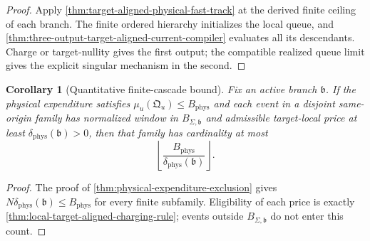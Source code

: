 \documentclass[11pt]{article}
\numberwithin{section}{part}
\theoremstyle{plain}
\newtheorem{corollary}[corollary]{Corollary}
\theoremstyle{definition}
\theoremstyle{remark}
\newcommand{\Phys}{\mathrm{phys}}
\newcommand{\Budget}{B_{\Phys}}
\begin{document}
\begin{proof}
Apply \cref{thm:target-aligned-physical-fast-track} at the derived finite
ceiling of each branch.  The finite ordered hierarchy initializes the local
queue, and \cref{thm:three-output-target-aligned-current-compiler} evaluates
all its descendants.  Charge or target-nullity gives the first output; the
compatible realized queue limit gives the explicit singular mechanism in the
second.
\end{proof}

\begin{corollary}[Quantitative finite-cascade bound]
\label{cor:finite-cascade-bound}
Fix an active branch \(\mathfrak b\).  If the physical expenditure satisfies
\(\mu_u(\mathfrak Q_u)\le\Budget\) and each event in a disjoint same-origin
family has normalized window in \(B_{\Sigma,\mathfrak b}\) and admissible
target-local price at least \(\delta_{\Phys}(\mathfrak b)>0\), then that family has cardinality
at most
\begin{equation}
 \label{eq:finite-cascade-bound}
 \left\lfloor
 \frac{\Budget}{\delta_{\Phys}(\mathfrak b)}
 \right\rfloor.
\end{equation}
\end{corollary}

\begin{proof}
The proof of \cref{thm:physical-expenditure-exclusion} gives
\(N\delta_{\Phys}(\mathfrak b)\le\Budget\) for every finite subfamily.
Eligibility of each price is exactly
\cref{thm:local-target-aligned-charging-rule}; events outside
\(B_{\Sigma,\mathfrak b}\) do not enter this count.
\end{proof}
\end{document}
